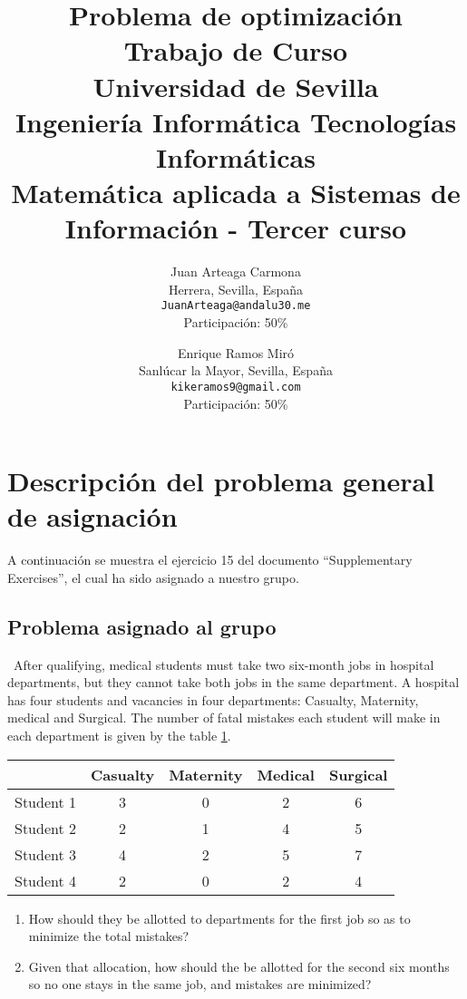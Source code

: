 \documentclass[11pt]{article}
\title{
        \textbf{Problema de optimización}\\
        \medskip
        \large{Trabajo de Curso}\\
        \bigskip
        Universidad de Sevilla\\ Ingeniería Informática Tecnologías Informáticas\\
        Matemática aplicada a Sistemas de Información - Tercer curso}
\author{
Juan Arteaga Carmona\\
Herrera, Sevilla, España \\
\texttt{JuanArteaga@andalu30.me}\\
Participación: 50\%
\and
Enrique Ramos Miró\\
Sanlúcar la Mayor, Sevilla, España \\
\texttt{kikeramos9@gmail.com}\\
Participación: 50\%
}
\begin{document}
\maketitle
\newpage

\tableofcontents
\listoftables
\listoffigures
\newpage

\section{Descripción del problema general de asignación}
A continuación se muestra el ejercicio 15 del documento ``Supplementary Exercises'', el cual ha sido asignado a nuestro grupo.

\subsection{Problema asignado al grupo}\label{sec:probasig}\
After qualifying, medical students must take two six-month jobs in hospital departments, but they cannot take both jobs in the same department. A hospital has four students and vacancies in four departments: Casualty, Maternity, medical and Surgical. The number of fatal mistakes each student will make in each department is given by the table \ref{tab:tablaProblema}.

\begin{table}[h!]
\centering
\begin{tabular}{@{}lcccc@{}}
\toprule
 & \multicolumn{1}{l}{Casualty} & \multicolumn{1}{l}{Maternity} & \multicolumn{1}{l}{Medical} & \multicolumn{1}{l}{Surgical} \\ \midrule
Student 1 & 3 & 0 & 2 & 6 \\
Student 2 & 2 & 1 & 4 & 5 \\
Student 3 & 4 & 2 & 5 & 7 \\
Student 4 & 2 & 0 & 2 & 4 \\ \bottomrule
\end{tabular}
\label{tab:tablaProblema}
\end{table}

\begin{enumerate}
    \item How should they be allotted to departments for the first job so as to minimize the total mistakes?
    \item Given that allocation, how should the be allotted for the second six months so no one stays in the same job, and mistakes are minimized?
\end{enumerate}
\end{document}
